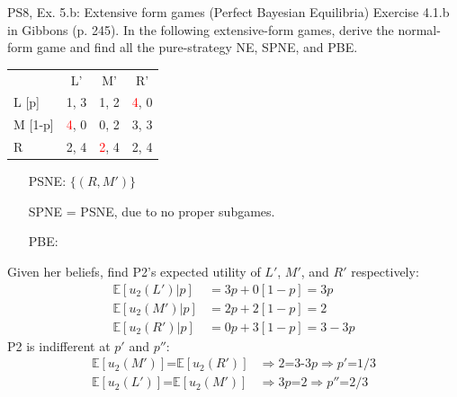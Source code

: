 \begin{frame}{PS8, Ex. 5.b: Extensive form games (Perfect Bayesian Equilibria)}
    Exercise 4.1.b in Gibbons (p. 245). In the following extensive-form games, derive the normal-form game and find all the pure-strategy NE, SPNE, and PBE.
    \vspace{-10pt}
    \begin{multicols}{2}
      \begin{table}
        \begin{tabular}{l|c|c|c|}
          \multicolumn{1}{c}{} & \multicolumn{1}{c}{L'} & \multicolumn{1}{c}{M'} & \multicolumn{1}{c}{R'} \\\cline{2-4}
          L [p]   & 1, \color{blue}3 & 1, 2 & \textcolor{red}{4}, 0 \\\cline{2-4}
          M [1-p] & \textcolor{red}{4}, 0 & 0, 2 & 3, \color{blue}3 \\\cline{2-4}
          R       & 2, \color{blue}4 & \textcolor{red}{2}, \color{blue}4 & 2, \color{blue}4 \\\cline{2-4}
        \end{tabular}
      \end{table} \vspace{-8pt}
      \begin{itemize}
        \item[PSNE:] $\{(R,M')\}$
        \item[SPNE =] PSNE, due to no proper subgames.
        \item[PBE:]
      \end{itemize} \vspace{-6pt}
      Given her beliefs, find P2's expected utility of $L'$, $M'$, and $R'$ respectively: \vspace{-6pt}
      \begin{align*}
        \mathbb{E}[u_2(L')|p]&=3p+0[1-p]=3p\\
        \mathbb{E}[u_2(M')|p]&=2p+2[1-p]=2\\
        \mathbb{E}[u_2(R')|p]&=0p+3[1-p]=3-3p
      \end{align*}
      P2 is indifferent at $p'$ and $p''$: \vspace{-6pt}
      \begin{align*}
        \mathbb{E}[u_2(M')]\text{=}\mathbb{E}[u_2(R')]&\Rightarrow 2\text{=3-3}p\Rightarrow p'\text{=}1/3\\
        \mathbb{E}[u_2(L')]\text{=}\mathbb{E}[u_2(M')]&\Rightarrow 3p\text{=}2\Rightarrow p''\text{=}2/3
      \end{align*}

\end{multicols}
\end{frame}
